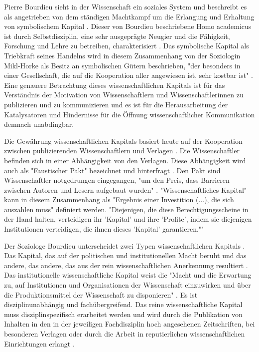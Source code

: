 Pierre Bourdieu sieht in der Wissenschaft ein soziales System und beschreibt es als angetrieben von dem ständigen Machtkampf um die Erlangung und Erhaltung von symbolischem Kapital \cite{Bourdieu_1988}. Dieser von Bourdieu beschriebene Homo academicus ist durch Selbstdisziplin, eine sehr ausgeprägte Neugier und die Fähigkeit, Forschung und Lehre zu betreiben, charakterisiert \cite{Bourdieu_1988}. Das symbolische Kapital als Triebkraft seines Handelns wird in diesem Zusammenhang von der Soziologin Mikl-Horke als Besitz an symbolischen Gütern beschrieben, "der besonders in einer Gesellschaft, die auf die Kooperation aller angewiesen ist, sehr kostbar ist" \cite{Mikl_2010}. Eine genauere Betrachtung dieses wissenschaftlichen Kapitals ist für das Verständnis der Motivation von Wissenschaftlern und Wissenschaftlerinnen zu publizieren und zu kommunizieren und es ist für die Herausarbeitung der Katalysatoren und Hindernisse für die Öffnung wissenschaftlicher Kommunikation demnach unabdingbar.

Die Gewährung wissenschaftlichen Kapitals basiert heute auf der Kooperation zwischen publizierenden Wissenschaftlern und Verlagen \cite{Herb_2006}. Die Wissenschaftler befinden sich in einer Abhängigkeit von den Verlagen. Diese Abhängigkeit wird auch als "Faustischer Pakt" bezeichnet und hinterfragt \cite{Hagner_2015} \cite{Parks_2002}. Den Pakt sind Wissenschaftler notgedrungen eingegangen, "um den Preis, dass Barrieren zwischen Autoren und Lesern aufgebaut wurden" \cite{Hagner_2015}. "Wissenschaftliches Kapital" kann in diesem Zusammenhang als "Ergebnis einer Investition (...), die sich auszahlen muss" \cite{Herb_2006} definiert werden. "Diejenigen, die diese Berechtigungsscheine in der Hand halten, verteidigen ihr 'Kapital' und ihre 'Profite', indem sie diejenigen Institutionen verteidigen, die ihnen dieses 'Kapital' garantieren."" \cite{Bourdieu_1992}

Der Soziologe Bourdieu unterscheidet zwei Typen wissenschaftlichen Kapitals \cite{Bourdieu_1998}. Das Kapital, das auf der politischen und institutionellen Macht beruht und das andere, das andere, das aus der rein wissenschaftlichen Anerkennung resultiert \cite{Mikl_2010}. Das institutionelle wissenschaftliche Kapital weist die "Macht und die Erwartung zu, auf Institutionen und Organisationen der Wissenschaft einzuwirken und über die Produktionsmittel der Wissenschaft zu disponieren" \cite[:257]{Barloesius_2008}. Es ist disziplinunabhängig und fachübergreifend. Das reine wissenschaftliche Kapital muss disziplinspezifisch erarbeitet werden und wird durch die Publikation von Inhalten in den in der jeweiligen Fachdisziplin hoch angesehenen Zeitschriften, bei besonderen Verlagen oder durch die Arbeit in reputierlichen wissenschaftlichen Einrichtungen erlangt \cite[:257]{Barloesius_2008}.

